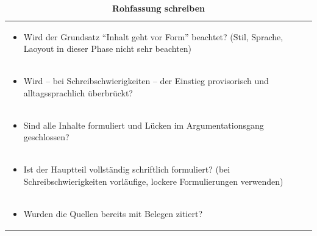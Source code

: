 \documentclass[]{book}
\providecommand{\tightlist}{%
  \setlength{\itemsep}{0pt}\setlength{\parskip}{0pt}}
\theoremstyle{definition}
\theoremstyle{definition}
\theoremstyle{definition}
\theoremstyle{remark}
\begin{document}
\begin{longtable}[]{@{}l@{}}
\caption{\textbf{\label{tab:rohfassung} Rohfassung
schreiben}}\tabularnewline
\toprule
\begin{minipage}[t]{0.97\columnwidth}\raggedright\strut
\begin{itemize}
\tightlist
\item
  Wird der Grundsatz ``Inhalt geht vor Form'' beachtet? (Stil, Sprache,
  Laoyout in dieser Phase nicht sehr beachten) \vspace{-6mm}
\end{itemize}\strut
\end{minipage}\tabularnewline
\begin{minipage}[t]{0.97\columnwidth}\raggedright\strut
\begin{itemize}
\tightlist
\item
  Wird -- bei Schreibschwierigkeiten -- der Einstieg provisorisch und
  alltagssprachlich überbrückt? \vspace{-6mm}
\end{itemize}\strut
\end{minipage}\tabularnewline
\begin{minipage}[t]{0.97\columnwidth}\raggedright\strut
\begin{itemize}
\tightlist
\item
  Sind alle Inhalte formuliert und Lücken im Argumentationsgang
  geschlossen? \vspace{-6mm}
\end{itemize}\strut
\end{minipage}\tabularnewline
\begin{minipage}[t]{0.97\columnwidth}\raggedright\strut
\begin{itemize}
\tightlist
\item
  Ist der Hauptteil vollständig schriftlich formuliert? (bei
  Schreibschwierigkeiten vorläufige, lockere Formulierungen verwenden)
  \vspace{-6mm}
\end{itemize}\strut
\end{minipage}\tabularnewline
\begin{minipage}[t]{0.97\columnwidth}\raggedright\strut
\begin{itemize}
\tightlist
\item
  Wurden die Quellen bereits mit Belegen zitiert? \vspace{-6mm}
\end{itemize}\strut
\end{minipage}\tabularnewline

\end{longtable}
\end{document}
